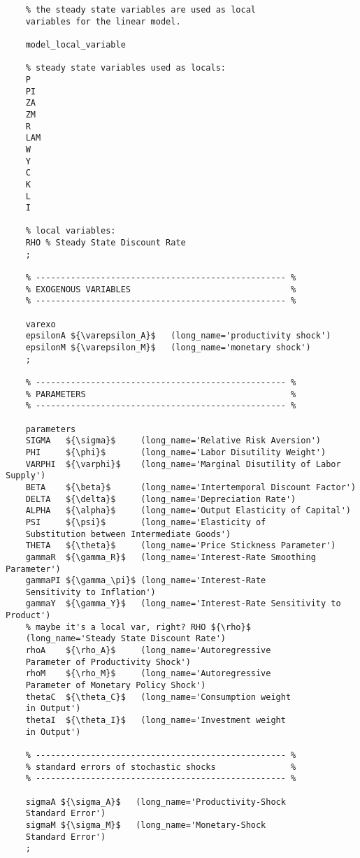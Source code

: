 \documentclass[
thesis.tex
]{subfiles}
\begin{document}
\begin{verbatim}
	% the steady state variables are used as local 
	variables for the linear model.
	
	model_local_variable
	
	% steady state variables used as locals:
	P
	PI
	ZA
	ZM
	R
	LAM
	W
	Y
	C
	K
	L
	I
	
	% local variables:
	RHO % Steady State Discount Rate
	;
	
	% -------------------------------------------------- %
	% EXOGENOUS VARIABLES                                %
	% -------------------------------------------------- %
	
	varexo
	epsilonA ${\varepsilon_A}$   (long_name='productivity shock')
	epsilonM ${\varepsilon_M}$   (long_name='monetary shock')
	;
	
	% -------------------------------------------------- %
	% PARAMETERS                                         %
	% -------------------------------------------------- %
	
	parameters
	SIGMA   ${\sigma}$     (long_name='Relative Risk Aversion')
	PHI     ${\phi}$       (long_name='Labor Disutility Weight')  
	VARPHI  ${\varphi}$    (long_name='Marginal Disutility of Labor Supply')
	BETA    ${\beta}$      (long_name='Intertemporal Discount Factor')
	DELTA   ${\delta}$     (long_name='Depreciation Rate')
	ALPHA   ${\alpha}$     (long_name='Output Elasticity of Capital')
	PSI     ${\psi}$       (long_name='Elasticity of 
	Substitution between Intermediate Goods')
	THETA   ${\theta}$     (long_name='Price Stickness Parameter')
	gammaR  ${\gamma_R}$   (long_name='Interest-Rate Smoothing Parameter')
	gammaPI ${\gamma_\pi}$ (long_name='Interest-Rate 
	Sensitivity to Inflation')
	gammaY  ${\gamma_Y}$   (long_name='Interest-Rate Sensitivity to Product')
	% maybe it's a local var, right? RHO ${\rho}$ 
	(long_name='Steady State Discount Rate')
	rhoA    ${\rho_A}$     (long_name='Autoregressive 
	Parameter of Productivity Shock')
	rhoM    ${\rho_M}$     (long_name='Autoregressive 
	Parameter of Monetary Policy Shock')
	thetaC  ${\theta_C}$   (long_name='Consumption weight 
	in Output')
	thetaI  ${\theta_I}$   (long_name='Investment weight 
	in Output')
	
	% -------------------------------------------------- % 
	% standard errors of stochastic shocks               %
	% -------------------------------------------------- %
	
	sigmaA ${\sigma_A}$   (long_name='Productivity-Shock 
	Standard Error')
	sigmaM ${\sigma_M}$   (long_name='Monetary-Shock 
	Standard Error')
	;
	

\end{verbatim}
\end{document}
